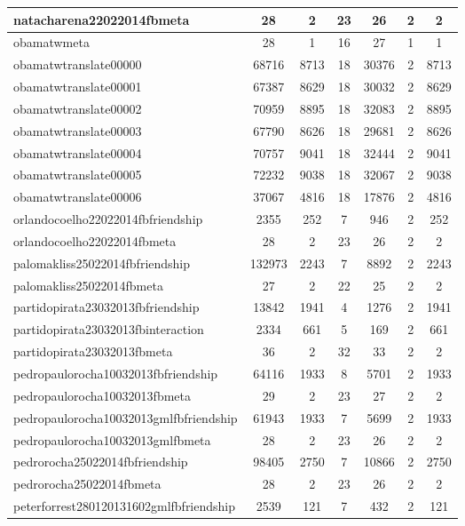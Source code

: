 \begin{table*}[h!]
\begin{center}
\begin{tabular}{| l | c | c | c | c | c | c |}
natacharena22022014fbmeta & 28  & 2  & 23  & 26  & 2  & 2 \\\hline
obamatwmeta & 28  & 1  & 16  & 27  & 1  & 1 \\\hline
obamatwtranslate00000 & 68716  & 8713  & 18  & 30376  & 2  & 8713 \\\hline
obamatwtranslate00001 & 67387  & 8629  & 18  & 30032  & 2  & 8629 \\\hline
obamatwtranslate00002 & 70959  & 8895  & 18  & 32083  & 2  & 8895 \\\hline
obamatwtranslate00003 & 67790  & 8626  & 18  & 29681  & 2  & 8626 \\\hline
obamatwtranslate00004 & 70757  & 9041  & 18  & 32444  & 2  & 9041 \\\hline
obamatwtranslate00005 & 72232  & 9038  & 18  & 32067  & 2  & 9038 \\\hline
obamatwtranslate00006 & 37067  & 4816  & 18  & 17876  & 2  & 4816 \\\hline
orlandocoelho22022014fbfriendship & 2355  & 252  & 7  & 946  & 2  & 252 \\\hline
orlandocoelho22022014fbmeta & 28  & 2  & 23  & 26  & 2  & 2 \\\hline
palomakliss25022014fbfriendship & 132973  & 2243  & 7  & 8892  & 2  & 2243 \\\hline
palomakliss25022014fbmeta & 27  & 2  & 22  & 25  & 2  & 2 \\\hline
partidopirata23032013fbfriendship & 13842  & 1941  & 4  & 1276  & 2  & 1941 \\\hline
partidopirata23032013fbinteraction & 2334  & 661  & 5  & 169  & 2  & 661 \\\hline
partidopirata23032013fbmeta & 36  & 2  & 32  & 33  & 2  & 2 \\\hline
pedropaulorocha10032013fbfriendship & 64116  & 1933  & 8  & 5701  & 2  & 1933 \\\hline
pedropaulorocha10032013fbmeta & 29  & 2  & 23  & 27  & 2  & 2 \\\hline
pedropaulorocha10032013gmlfbfriendship & 61943  & 1933  & 7  & 5699  & 2  & 1933 \\\hline
pedropaulorocha10032013gmlfbmeta & 28  & 2  & 23  & 26  & 2  & 2 \\\hline
pedrorocha25022014fbfriendship & 98405  & 2750  & 7  & 10866  & 2  & 2750 \\\hline
pedrorocha25022014fbmeta & 28  & 2  & 23  & 26  & 2  & 2 \\\hline
peterforrest280120131602gmlfbfriendship & 2539  & 121  & 7  & 432  & 2  & 121 \\\hline

\end{tabular}
\end{center}
\end{table*}
